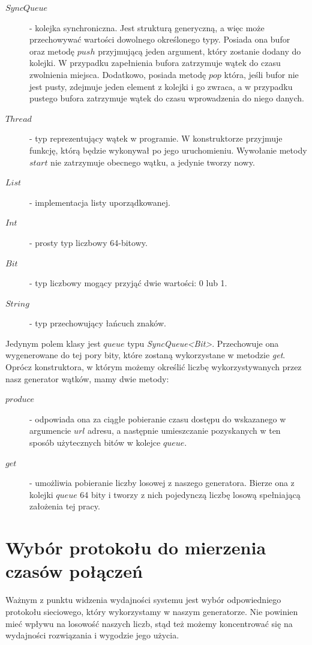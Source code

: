 \begin{description}
\item[$SyncQueue$] - kolejka synchroniczna. Jest strukturą generyczną, a więc może przechowywać wartości dowolnego określonego typy.  Posiada ona bufor oraz metodę \textbf{$push$} przyjmującą jeden argument, który zostanie dodany do kolejki. W przypadku zapełnienia bufora zatrzymuje wątek do czasu zwolnienia miejsca. Dodatkowo, posiada metodę \textbf{$pop$} która, jeśli bufor nie jest pusty, zdejmuje jeden element z kolejki i go zwraca, a w przypadku pustego bufora zatrzymuje wątek do czasu wprowadzenia do niego danych.
\item[$Thread$] - typ reprezentujący wątek w programie. W konstruktorze przyjmuje funkcję, którą będzie wykonywał po jego uruchomieniu. Wywołanie metody \textbf{$start$} nie zatrzymuje obecnego wątku, a jedynie tworzy nowy. 
\item[$List$] - implementacja listy uporządkowanej.
\item[$Int$] - prosty typ liczbowy 64-bitowy.
\item[$Bit$] - typ liczbowy mogący przyjąć dwie wartości: 0 lub 1.
\item[$String$] - typ przechowujący łańcuch znaków.
\end{description}
Jedynym polem klasy jest $queue$ typu \emph{SyncQueue\textless Bit\textgreater}. Przechowuje ona wygenerowane do tej pory bity, które zostaną wykorzystane w metodzie \emph{get}. Oprócz konstruktora, w którym możemy określić liczbę wykorzystywanych przez nasz generator wątków, mamy dwie metody:
\begin{description}
\item[$produce$] - odpowiada ona za ciągłe pobieranie czasu dostępu do wskazanego w argumencie $url$ adresu, a następnie umieszczanie pozyskanych w ten sposób użytecznych bitów w kolejce $queue$.
\item[$get$] - umożliwia pobieranie liczby losowej z naszego generatora. Bierze ona z kolejki $queue$ 64 bity i tworzy z nich pojedynczą liczbę losową spełniającą założenia tej pracy.
\end{description}

\section{Wybór protokołu do mierzenia czasów połączeń}
Ważnym z punktu widzenia wydajności systemu jest wybór odpowiedniego protokołu sieciowego, który wykorzystamy w naszym generatorze. Nie powinien mieć wpływu na losowość naszych liczb, stąd też możemy koncentrować się na wydajności rozwiązania i wygodzie jego użycia.
